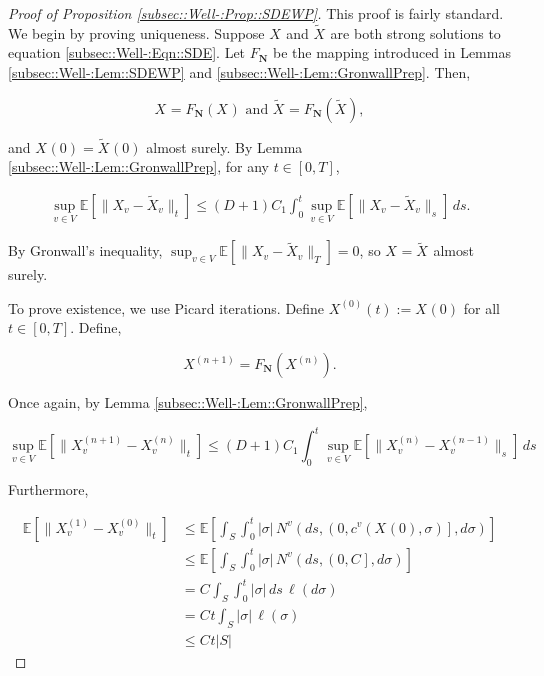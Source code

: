 \documentclass[12pt]{article}
\newcommand{\skipLine}{\vspace{12pt}}
\newcommand{\mb}{\mathbb}
\newcommand{\te}{\text}
\newcommand{\ex}[1]{\mb{E}\left[#1\right]}			%
\newcommand{\defeq}{:=}								%
\renewcommand{\v}{v}							%
\renewcommand{\S}{S}							%
\newcommand{\s}{\sigma}							%
\newcommand{\T}{T}								%
\renewcommand{\t}{t}							%
\renewcommand{\tt}{s}							%
\newcommand{\X}{X}								%
\newcommand{\IGr}{c}							%
\newcommand{\vind}[1]{^{#1}}					%
\newcommand{\cind}[1]{_{#1}}					%
\newcommand{\tp}[1]{(#1)}						%
\newcommand{\tip}[1]{#1}						%
\newcommand{\const}{C}							%
\newcommand{\degr}{D}							%
\newcommand{\sln}[1]{^{(#1)}}						%
\newcommand{\poisses}{\mathbf{N}}				%
\newcommand{\poiss}{N}							%
\newcommand{\Sm}{\ell}							%
\newcommand{\Fpo}{F_{\poisses}}					%
\newcommand{\alt}[1]{\widetilde{#1}}			%
\newcommand{\indx}[1]{_{#1}}					%
\begin{document}
\begin{proof}[Proof of Proposition \ref{subsec::Well-:Prop::SDEWP}]

This proof is fairly standard. We begin by proving uniqueness. Suppose \(\X\cind{}\tip{}\) and \(\alt{\X}\cind{}\tip{}\) are both strong solutions to equation \ref{subsec::Well-:Eqn::SDE}. Let \(\Fpo\) be the mapping introduced in Lemmas \ref{subsec::Well-:Lem::SDEWP} and \ref{subsec::Well-:Lem::GronwallPrep}. Then,

\[\X\cind{}\tip{} = \Fpo(\X\cind{}\tip{})\te{ and } \alt{\X}\cind{}\tip{} = \Fpo(\alt{\X}\cind{}\tip{}),\]

and \(\X\cind{}\tp{0} = \alt{\X}\cind{}\tp{0}\) almost surely. By Lemma \ref{subsec::Well-:Lem::GronwallPrep}, for any \(\t\in [0,\T]\),

\begin{align*}
\sup_{\v\in V}\ex{\|\X\cind{\v}\tip{} - \alt{\X}\cind{\v}\tip{}\|_\t} \leq (\degr+1)\const\indx{1}\int_0^\t\sup_{\v\in V} \ex{\|\X\cind{\v}\tip{} - \alt{\X}\cind{\v}\tip{}\|_\tt}\,d\tt.
\end{align*}

By Gronwall's inequality, \(\sup_{\v \in V} \ex{\|\X\cind{\v}\tip{} - \alt{\X}\cind{\v}\tip{}\|_\T} = 0\), so \(\X\cind{}\tip{} = \alt{\X}\cind{}\tip{}\) almost surely.

\skipLine

To prove existence, we use Picard iterations. Define \(\X\sln{0}\cind{}\tp{\t} \defeq \X\cind{}\tp{0}\) for all \(\t \in [0,\T]\). Define,

\[\X\sln{n+1}\cind{}\tip{} = \Fpo(\X\sln{n}\cind{}\tip{}).\]

Once again, by Lemma \ref{subsec::Well-:Lem::GronwallPrep},

\[\sup_{\v \in V} \ex{\|\X\sln{n+1}\cind{\v}\tip{} - \X\sln{n}\cind{\v}\tip{}\|_\t} \leq (\degr+1)\const\indx{1} \int_0^\t \sup_{\v \in V} \ex{\|\X\sln{n}\cind{\v}\tip{} - \X\sln{n-1}\cind{\v}\tip{}\|_\tt}\,d\tt\] 

Furthermore, 

\begin{align*}
\ex{\|\X\sln{1}\cind{\v}\tip{} - \X\sln{0}\cind{\v}\tip{}\|_\t} &\leq \ex{\int_\S\int_0^\t |\s|\,\poiss\vind{\v}\left(d\tt,\left(0,\IGr\vind{\v}(\X\cind{}\tp{0},\s)\right],d\s\right)}\\
&\leq \ex{\int_\S\int_0^\t |\s|\,\poiss\vind{\v}\left(d\tt,\left(0,\const\indx{}\right],d\s\right)}\\
&= \const\indx{}\int_\S\int_0^\t |\s|\,d\tt\,\Sm(d\s)\\
&=\const\indx{}\t\int_\S |\s|\,\Sm(\s)\\
&\leq \const\indx{}\t|\S|
\end{align*}


\end{proof}
\end{document}
